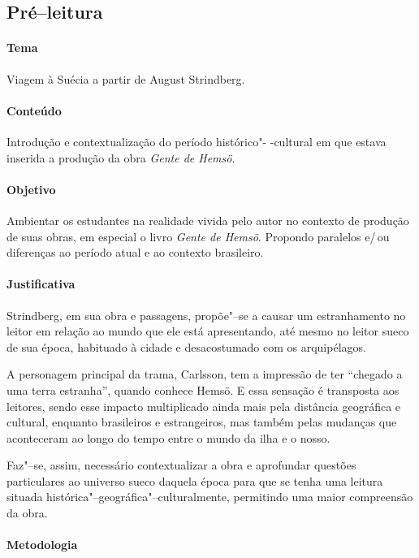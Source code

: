 \documentclass[12pt]{extarticle}
\begin{document}
\subsection{Pré--leitura}

\paragraph{Tema} Viagem à Suécia a partir de August Strindberg.

\paragraph{Conteúdo} Introdução e contextualização do período histórico"-
-cultural em que estava inserida a produção da obra \emph{Gente de Hemsö}.

\paragraph{Objetivo} Ambientar os estudantes na realidade vivida pelo 
autor no contexto de produção de suas obras, em especial o livro 
\emph{Gente de Hemsö}. Propondo paralelos e/\,ou diferenças ao período 
atual e ao contexto brasileiro. 

\paragraph{Justificativa} Strindberg, em sua obra e passagens, propõe"--se 
a causar um estranhamento no leitor em relação ao mundo que ele está
apresentando, até mesmo no leitor sueco de sua época, habituado à
cidade e desacostumado com os arquipélagos.

A personagem principal da trama, Carlsson, tem a impressão
de ter “chegado a uma terra estranha”, quando conhece Hemsö. E essa 
sensação é transposta aos leitores, sendo esse impacto multiplicado ainda 
mais pela distância geográfica e cultural, enquanto brasileiros e 
estrangeiros, mas também pelas mudanças que aconteceram ao longo do tempo 
entre o mundo da ilha e o nosso.

Faz"--se, assim, necessário contextualizar a obra e aprofundar questões 
particulares ao universo sueco daquela época para que se tenha uma leitura 
situada histórica"--geográfica"--culturalmente, permitindo uma maior 
compreensão da obra. 

\paragraph{Metodologia}
\end{document}
